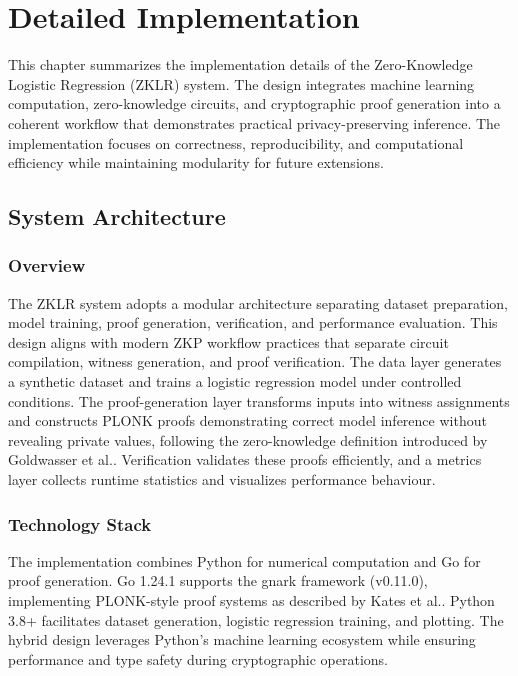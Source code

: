 \chapter{Detailed Implementation}
\label{chap:detailed-implementation}

This chapter summarizes the implementation details of the Zero-Knowledge Logistic Regression (ZKLR) system. The design integrates machine learning computation, zero-knowledge circuits, and cryptographic proof generation into a coherent workflow that demonstrates practical privacy-preserving inference. The implementation focuses on correctness, reproducibility, and computational efficiency while maintaining modularity for future extensions.

\section{System Architecture}

\subsection{Overview}

The ZKLR system adopts a modular architecture separating dataset preparation, model training, proof generation, verification, and performance evaluation. This design aligns with modern ZKP workflow practices that separate circuit compilation, witness generation, and proof verification. The data layer generates a synthetic dataset and trains a logistic regression model under controlled conditions. The proof-generation layer transforms inputs into witness assignments and constructs PLONK proofs demonstrating correct model inference without revealing private values, following the zero-knowledge definition introduced by Goldwasser et al.. Verification validates these proofs efficiently, and a metrics layer collects runtime statistics and visualizes performance behaviour.

\subsection{Technology Stack}

The implementation combines Python for numerical computation and Go for proof generation. Go 1.24.1 supports the gnark framework (v0.11.0), implementing PLONK-style proof systems as described by Kates et al.. Python 3.8+ facilitates dataset generation, logistic regression training, and plotting. The hybrid design leverages Python's machine learning ecosystem while ensuring performance and type safety during cryptographic operations.

